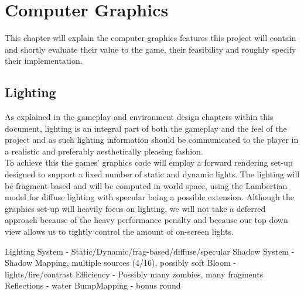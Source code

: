 \chapter{Computer Graphics}

This chapter will explain the computer graphics features this project will contain and shortly evaluate their value to the game, their feasibility and roughly specify their implementation.\\



\section{Lighting}
As explained in the gameplay and environment design chapters within this document, lighting is an integral part of both the gameplay and the feel of the project and as such lighting information should be communicated to the player in a realistic and preferably aesthetically pleasing fashion.\\
To achieve this the games' graphics code will employ a forward rendering set-up designed to support a fixed number of static and dynamic lights. The lighting will be fragment-based and will be computed in world space, using the Lambertian model for diffuse lighting with specular being a possible extension.
Although the graphics set-up will heavily focus on lighting, we will not take a deferred approach because of the heavy performance penalty and because our top down view allows us to tightly control the amount of on-screen lights.

Lighting System - Static/Dynamic/frag-based/diffuse/specular
Shadow System - Shadow Mapping, multiple sources (4/16), possibly soft
Bloom - lights/fire/contrast
Efficiency - Possibly many zombies, many fragments
Reflections - water 
BumpMapping - bonus round
